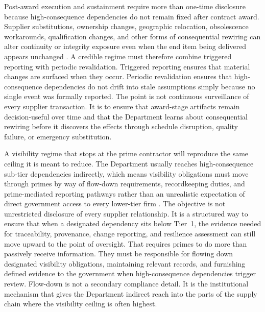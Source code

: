 Post-award execution and sustainment require more than one-time disclosure because high-consequence dependencies do not remain fixed after contract award. Supplier substitutions, ownership changes, geographic relocation, obsolescence workarounds, qualification changes, and other forms of consequential rewiring can alter continuity or integrity exposure even when the end item being delivered appears unchanged \parencite{ch5_dodi424515,ch5_nist800161r1upd1}. A credible regime must therefore combine triggered reporting with periodic revalidation. Triggered reporting ensures that material changes are surfaced when they occur. Periodic revalidation ensures that high-consequence dependencies do not drift into stale assumptions simply because no single event was formally reported. The point is not continuous surveillance of every supplier transaction. It is to ensure that award-stage artifacts remain decision-useful over time and that the Department learns about consequential rewiring before it discovers the effects through schedule disruption, quality failure, or emergency substitution.

A visibility regime that stops at the prime contractor will reproduce the same ceiling it is meant to reduce. The Department usually reaches high-consequence sub-tier dependencies indirectly, which means visibility obligations must move through primes by way of flow-down requirements, recordkeeping duties, and prime-mediated reporting pathways rather than an unrealistic expectation of direct government access to every lower-tier firm \parencite{ch5_dfars2522467008,ch5_dfars2522397018,ch5_dodi424515}. The objective is not unrestricted disclosure of every supplier relationship. It is a structured way to ensure that when a designated dependency sits below Tier~1, the evidence needed for traceability, provenance, change reporting, and resilience assessment can still move upward to the point of oversight. That requires primes to do more than passively receive information. They must be responsible for flowing down designated visibility obligations, maintaining relevant records, and furnishing defined evidence to the government when high-consequence dependencies trigger review. Flow-down is not a secondary compliance detail. It is the institutional mechanism that gives the Department indirect reach into the parts of the supply chain where the visibility ceiling is often highest.

